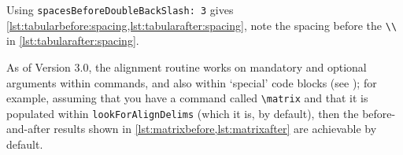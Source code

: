 	Using  \texttt{spacesBeforeDoubleBackSlash: 3} gives \cref{lst:tabularbefore:spacing,lst:tabularafter:spacing},
	note the spacing before the \lstinline!\\! in \cref{lst:tabularafter:spacing}.

	\begin{minipage}{.45\textwidth}
	\end{minipage}%
	\hfill
	\begin{minipage}{.45\textwidth}
	\end{minipage}%

	As of Version 3.0, the alignment routine works on mandatory and optional arguments within commands, and also within `special' code blocks
	(see ); for example, assuming that you have a command called \lstinline!\matrix!
	and that it is populated within \texttt{lookForAlignDelims} (which it is, by default), then the before-and-after results
	shown in \cref{lst:matrixbefore,lst:matrixafter} are achievable by default.

	\begin{minipage}{.45\textwidth}
	\end{minipage}%
	\hfill
	\begin{minipage}{.45\textwidth}
	\end{minipage}%


